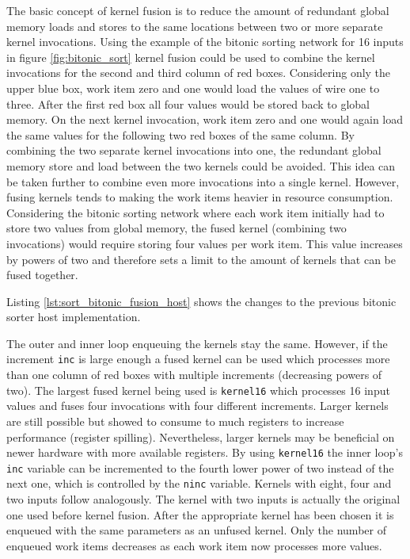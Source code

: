 The basic concept of kernel fusion is to reduce the amount of redundant global memory loads and stores to the same locations between two or more separate kernel invocations.
Using the example of the bitonic sorting network for 16 inputs in figure \ref{fig:bitonic_sort} kernel fusion could be used to combine the kernel invocations for the second and third column of red boxes. Considering only the upper blue box, work item zero and one would load the values of wire one to three. After the first red box all four values would be stored back to global memory. On the next kernel invocation, work item zero and one would again load the same values for the following two red boxes of the same column. By combining the two separate kernel invocations into one, the redundant global memory store and load between the two kernels could be avoided.
This idea can be taken further to combine even more invocations into a single kernel. However, fusing kernels tends to making the work items heavier in resource consumption. Considering the bitonic sorting network where each work item initially had to store two values from global memory, the fused kernel (combining two invocations) would require storing four values per work item. This value increases by powers of two and therefore sets a limit to the amount of kernels that can be fused together.

Listing \ref{lst:sort_bitonic_fusion_host} shows the changes to the previous bitonic sorter host implementation.



The outer and inner loop enqueuing the kernels stay the same. However, if the increment \lstinline!inc! is large enough a fused kernel can be used which processes more than one column of red boxes with multiple increments (decreasing powers of two). The largest fused kernel being used is \lstinline!kernel16! which processes 16 input values and fuses four invocations with four different increments. Larger kernels are still possible but showed to consume to much registers to increase performance (register spilling). Nevertheless, larger kernels may be beneficial on newer hardware with more available registers. By using \lstinline!kernel16! the inner loop's \lstinline!inc! variable can be incremented to the fourth lower power of two instead of the next one, which is controlled by the \lstinline!ninc! variable. Kernels with eight, four and two inputs follow analogously. The kernel with two inputs is actually the original one used before kernel fusion.
After the appropriate kernel has been chosen it is enqueued with the same parameters as an unfused kernel. Only the number of enqueued work items decreases as each work item now processes more values.

